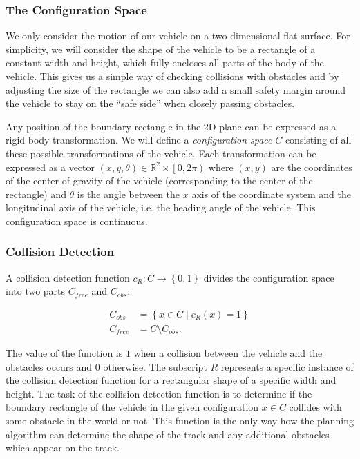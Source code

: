 \subsubsection{The Configuration Space}

We only consider the motion of our vehicle on a two-dimensional flat surface. For simplicity, we will consider the shape of the vehicle to be a rectangle of a constant width and height, which fully encloses all parts of the body of the vehicle. This gives us a simple way of checking collisions with obstacles and by adjusting the size of the rectangle we can also add a small safety margin around the vehicle to stay on the ``safe side'' when closely passing obstacles.

Any position of the boundary rectangle in the 2D plane can be expressed as a rigid body transformation. We will define a \textit{configuration space} $C$ consisting of all these possible transformations of the vehicle. Each transformation can be expressed as a vector $\left( x, y, \theta\right)\in \mathbb{R}^2\times \left[0, 2\pi\right)$ where $\left( x, y\right)$ are the coordinates of the center of gravity of the vehicle (corresponding to the center of the rectangle) and $\theta$ is the angle between the $x$ axis of the coordinate system and the longitudinal axis of the vehicle, i.e. the heading angle of the vehicle.  This configuration space is continuous.

\subsubsection{Collision Detection}
\label{sec:collision-detection}

A collision detection function $c_{R}: C \rightarrow \left\{0, 1\right\}$ divides the configuration space into two parts $C_{free}$ and $C_{obs}$:

\begin{equation*}
\begin{aligned}
C_{obs} &= \left\{x\in C \mid c_{R}(x)=1\right\} \\
C_{free} &= C \setminus C_{obs}.
\end{aligned}
\end{equation*}

The value of the function is $1$ when a collision between the vehicle and the obstacles occurs and $0$ otherwise. The subscript $R$ represents a specific instance of the collision detection function for a rectangular shape of a specific width and height. The task of the collision detection function is to determine if the boundary rectangle of the vehicle in the given configuration $x\in C$ collides with some obstacle in the world or not. This function is the only way how the planning algorithm can determine the shape of the track and any additional obstacles which appear on the track.

